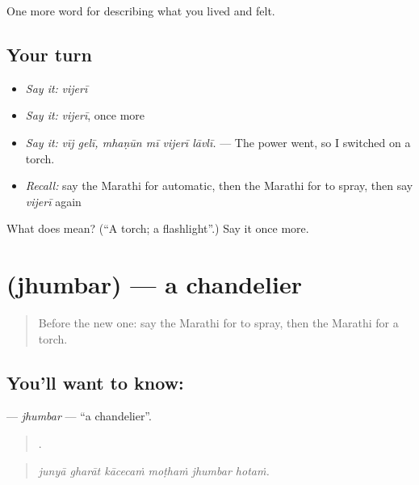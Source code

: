 \begin{grammarlens}[title={What you've built}]
One more word for describing what you lived and felt.
\end{grammarlens}

\subsection*{Your turn}
\begin{itemize}
\raggedright
  \item \emph{Say it:} \emph{vijerī}
  \item \emph{Say it:} \emph{vijerī}, once more
  \item \emph{Say it:} \emph{vīj gelī, mhaṇūn mī vijerī lāvlī.} — The power went, so I switched on a torch.
  \item \emph{Recall:} say the Marathi for automatic, then the Marathi for to spray, then say \emph{vijerī} again
\end{itemize}

\begin{tcolorbox}[breakable,colback=teal!4,colframe=teal!35!black,title={Before you move on}]
What does  mean? (\textquotedblleft{}A torch; a flashlight\textquotedblright{}.) Say it once more.
\end{tcolorbox}
\section[\texorpdfstring{\mr{झुंबर} (jhumbar)}{झुंबर (jhumbar)}]{ (jhumbar) — a chandelier}

\label{lesson:MR-C519-jhumbar}



\begin{quote}
Before the new one: say the Marathi for to spray, then the Marathi for a torch.
\end{quote}

\subsection*{You'll want to know: }
\textbf{} — \emph{jhumbar} — \textquotedblleft{}a chandelier\textquotedblright{}.

\begin{quote}
     .
\end{quote}

\begin{quote}
\emph{junyā gharāt kācecaṁ moṭhaṁ jhumbar hotaṁ.}
\end{quote}

